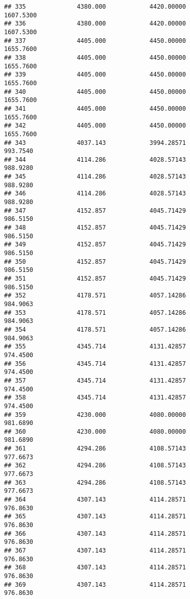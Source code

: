 \documentclass[]{article}
\begin{document}
\begin{verbatim}
## 335              4380.000            4420.00000                1607.5300
## 336              4380.000            4420.00000                1607.5300
## 337              4405.000            4450.00000                1655.7600
## 338              4405.000            4450.00000                1655.7600
## 339              4405.000            4450.00000                1655.7600
## 340              4405.000            4450.00000                1655.7600
## 341              4405.000            4450.00000                1655.7600
## 342              4405.000            4450.00000                1655.7600
## 343              4037.143            3994.28571                 993.7540
## 344              4114.286            4028.57143                 988.9280
## 345              4114.286            4028.57143                 988.9280
## 346              4114.286            4028.57143                 988.9280
## 347              4152.857            4045.71429                 986.5150
## 348              4152.857            4045.71429                 986.5150
## 349              4152.857            4045.71429                 986.5150
## 350              4152.857            4045.71429                 986.5150
## 351              4152.857            4045.71429                 986.5150
## 352              4178.571            4057.14286                 984.9063
## 353              4178.571            4057.14286                 984.9063
## 354              4178.571            4057.14286                 984.9063
## 355              4345.714            4131.42857                 974.4500
## 356              4345.714            4131.42857                 974.4500
## 357              4345.714            4131.42857                 974.4500
## 358              4345.714            4131.42857                 974.4500
## 359              4230.000            4080.00000                 981.6890
## 360              4230.000            4080.00000                 981.6890
## 361              4294.286            4108.57143                 977.6673
## 362              4294.286            4108.57143                 977.6673
## 363              4294.286            4108.57143                 977.6673
## 364              4307.143            4114.28571                 976.8630
## 365              4307.143            4114.28571                 976.8630
## 366              4307.143            4114.28571                 976.8630
## 367              4307.143            4114.28571                 976.8630
## 368              4307.143            4114.28571                 976.8630
## 369              4307.143            4114.28571                 976.8630

\end{verbatim}
\end{document}
